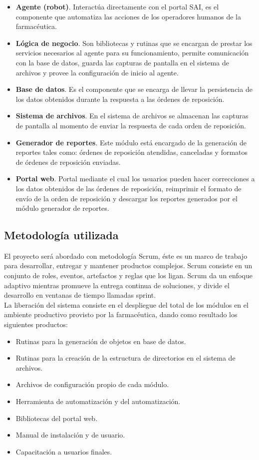 \begin{itemize}
\item \textbf{Agente (robot)}. Interactúa directamente con el portal SAI, es el componente que automatiza las acciones de los operadores humanos de la farmacéutica.
\item \textbf{Lógica de negocio}. Son bibliotecas y rutinas que se encargan de prestar los servicios necesarios al agente para su funcionamiento, permite comunicación con la base de datos, guarda las capturas de pantalla en el sistema de archivos y provee la configuración de inicio al agente.
\item \textbf{Base de datos}. Es el componente que se encarga de llevar la persistencia de los datos obtenidos durante la respuesta a las órdenes de reposición.
\item \textbf{Sistema de archivos}. En el sistema de archivos se almacenan las capturas de pantalla al momento de enviar la respuesta de cada orden de reposición.
\item \textbf{Generador de reportes}. Este módulo está encargado de la generación de reportes tales como: órdenes de reposición atendidas, canceladas y formatos de órdenes de reposición enviadas.
\item \textbf{Portal web}. Portal mediante el cual los usuarios pueden hacer correcciones a los datos obtenidos de las órdenes de reposición, reimprimir el formato de envío de la orden de reposición  y descargar los reportes generados por el módulo generador de reportes.
\end{itemize}

\subsection{Metodología utilizada}
El proyecto será abordado con metodología Scrum, éste es un marco de trabajo para desarrollar, entregar y mantener productos complejos. Scrum consiste en un conjunto de roles, eventos, artefactos y reglas que los ligan. Scrum da un enfoque adaptivo mientras promueve la entrega continua de soluciones, y divide el desarrollo en ventanas de tiempo llamadas sprint\cite{scrum}.\\
La liberación del sistema consiste en el despliegue del total de los módulos en el ambiente productivo provisto por la farmacéutica, dando como resultado los siguientes productos:
\begin{itemize}
\item Rutinas para la generación de objetos en base de datos.
\item Rutinas para la creación de la estructura de directorios en el sistema de archivos.
\item Archivos de configuración propio de cada módulo.
\item Herramienta de automatización y del automatización.
\item Bibliotecas del portal web.
\item Manual de instalación y de usuario.
\item Capacitación a usuarios finales.
\end{itemize}
 

